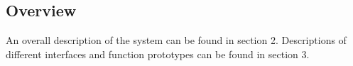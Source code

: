 
\subsection{Overview}

An overall description of the system can be found in section
2. Descriptions of different interfaces and  function
prototypes can be found in section 3.

